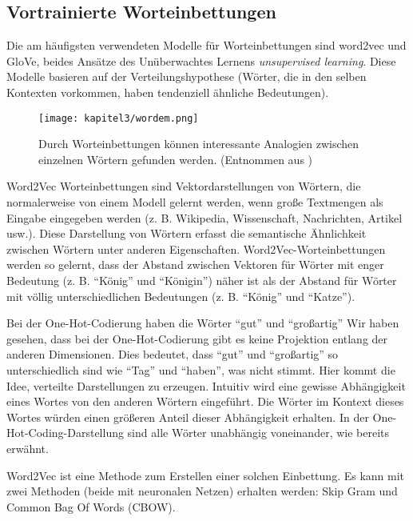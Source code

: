 \subsection{Vortrainierte Worteinbettungen}

Die am häufigsten verwendeten Modelle für Worteinbettungen sind word2vec und GloVe, beides Ansätze des Unüberwachtes Lernens \textit{unsupervised learning}. Diese Modelle basieren
auf der Verteilungshypothese (Wörter, die in den selben Kontexten vorkommen, haben tendenziell ähnliche Bedeutungen).

\begin{figure}[H]
    \centering
    \texttt{[image: kapitel3/wordem.png]}
    \caption[Worteinbettungen erzeugen Analogien zwischen Wörtern]{Durch Worteinbettungen können interessante Analogien zwischen einzelnen Wörtern gefunden werden. (Entnommen aus \cite*{wordemdgood})}
    \label{Word2Vex}
\end{figure}


Word2Vec \cite*{Mikolov2013} Worteinbettungen sind Vektordarstellungen von Wörtern, die normalerweise von einem Modell gelernt werden, wenn große Textmengen als Eingabe eingegeben werden (z. B. Wikipedia, Wissenschaft, Nachrichten, Artikel usw.). Diese Darstellung von Wörtern erfasst die semantische Ähnlichkeit zwischen Wörtern unter anderen Eigenschaften. Word2Vec-Worteinbettungen werden so gelernt, dass der Abstand zwischen Vektoren für Wörter mit enger Bedeutung (z. B. \enquote{König} und \enquote{Königin}) näher ist als der Abstand für Wörter mit völlig unterschiedlichen Bedeutungen (z. B. \enquote{König} und \enquote{Katze}).

Bei der One-Hot-Codierung haben die Wörter \enquote{gut} und \enquote{großartig}
Wir haben gesehen, dass bei der One-Hot-Codierung gibt es keine Projektion entlang der anderen Dimensionen. Dies bedeutet, dass \enquote{gut} und \enquote{großartig} so unterschiedlich sind wie \enquote{Tag} und \enquote{haben}, was nicht stimmt. Hier kommt die Idee, verteilte Darstellungen zu erzeugen. Intuitiv wird eine gewisse Abhängigkeit eines Wortes von den anderen Wörtern eingeführt. Die Wörter im Kontext dieses Wortes würden einen größeren Anteil dieser Abhängigkeit erhalten. In der One-Hot-Coding-Darstellung sind alle Wörter unabhängig voneinander, wie bereits erwähnt.

Word2Vec ist eine Methode zum Erstellen einer solchen Einbettung. Es kann mit zwei Methoden (beide mit neuronalen Netzen) erhalten werden: Skip Gram und Common Bag Of Words (CBOW).



